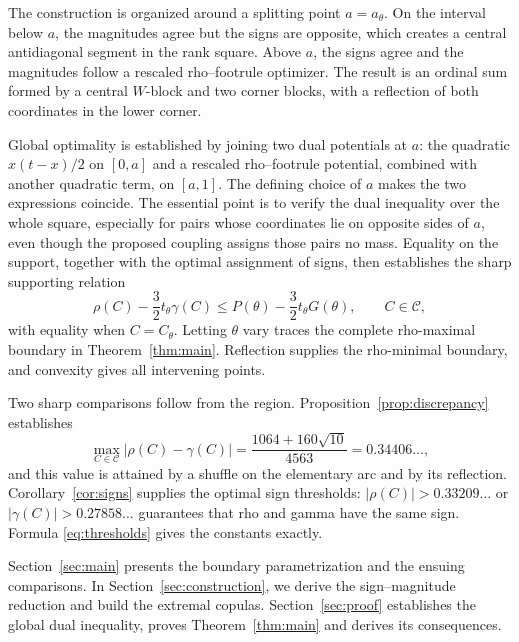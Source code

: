 \documentclass{article}
\theoremstyle{definition}
\theoremstyle{remark}
\newcommand{\1}{\mathds{1}}
\newcommand{\CC}{\mathcal{C}}
\begin{document}
The construction is organized around a splitting point $a=a_\theta$. On the
interval below $a$, the magnitudes agree but the signs are opposite, which
creates a central antidiagonal segment in the rank square. Above $a$, the
signs agree and the magnitudes follow a rescaled rho--footrule optimizer. The
result is an ordinal sum formed by a central $W$-block and two corner blocks,
with a reflection of both coordinates in the lower corner.

Global optimality is established by joining two dual potentials at $a$: the
quadratic $x(t-x)/2$ on $[0,a]$ and a rescaled rho--footrule potential,
combined with another quadratic term, on $[a,1]$. The defining choice of
$a$ makes the two expressions coincide. The essential point is to verify the
dual inequality over the whole square, especially for pairs whose coordinates
lie on opposite sides of $a$, even though the proposed coupling assigns those
pairs no mass. Equality on the support, together with the optimal assignment
of signs, then establishes the sharp supporting relation
\begin{equation}\label{eq:intro-support}
    \rho(C)-\frac32t_\theta\gamma(C)
    \le
    P(\theta)-\frac32t_\theta G(\theta),
    \qquad C\in\CC,
\end{equation}
with equality when $C=C_\theta$. Letting $\theta$ vary traces the complete
rho-maximal boundary in Theorem~\ref{thm:main}. Reflection supplies the
rho-minimal boundary, and convexity gives all intervening points.

Two sharp comparisons follow from the region. Proposition~\ref{prop:discrepancy}
establishes
\begin{equation}\label{eq:intro-discrepancy}
    \max_{C\in\CC}|\rho(C)-\gamma(C)|
    =\frac{1064+160\sqrt{10}}{4563}
    =0.34406\ldots,
\end{equation}
and this value is attained by a shuffle on the elementary arc and by its
reflection. Corollary~\ref{cor:signs} supplies the optimal sign thresholds:
$|\rho(C)|>0.33209\ldots$ or
$|\gamma(C)|>0.27858\ldots$ guarantees that rho and gamma have the same
sign. Formula \eqref{eq:thresholds} gives the constants exactly.

Section~\ref{sec:main} presents the boundary parametrization and the ensuing
comparisons. In Section~\ref{sec:construction}, we derive the sign--magnitude
reduction and build the extremal copulas. Section~\ref{sec:proof} establishes
the global dual inequality, proves Theorem~\ref{thm:main} and derives its
consequences.
\end{document}
